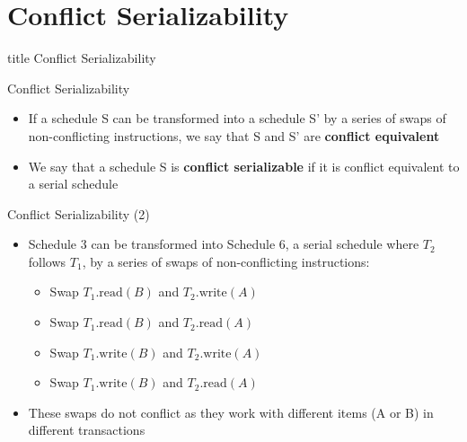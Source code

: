 \documentclass[aspectratio=169, xcolor=dvipsnames]{beamer}
\begin{document}
\section{Conflict Serializability}
\begin{frame}
  \vfill
  \centering
  \begin{beamercolorbox}[sep=8pt,center,shadow=true,rounded=true]{title}
    Conflict Serializability\par%
  \end{beamercolorbox}
  \vfill
\end{frame}

\begin{frame}{Conflict Serializability}
    \begin{itemize}[<+->]
        \item If a schedule S can be transformed into a schedule S' by a series of swaps of non-conflicting instructions, we say that S and S' are \textbf{conflict equivalent}
        \item We say that a schedule S is \textbf{conflict serializable} if it is conflict equivalent to a serial schedule
    \end{itemize}
\end{frame}

\begin{frame}{Conflict Serializability (2)}
    \begin{itemize}[<+->]
        \item Schedule 3 can be transformed into Schedule 6, a serial schedule where $T_2$ follows $T_1$, by a series of swaps of non-conflicting instructions:
        \begin{itemize}[<+->]
            \item Swap $T_1.\text{read}(B)$ and $T_2.\text{write}(A)$
            \item Swap $T_1.\text{read}(B)$ and $T_2.\text{read}(A)$
            \item Swap $T_1.\text{write}(B)$ and $T_2.\text{write}(A)$
            \item Swap $T_1.\text{write}(B)$ and $T_2.\text{read}(A)$
        \end{itemize}
        \item These swaps do not conflict as they work with different items (A or B) in different transactions
    \end{itemize}
\end{frame}
\end{document}
